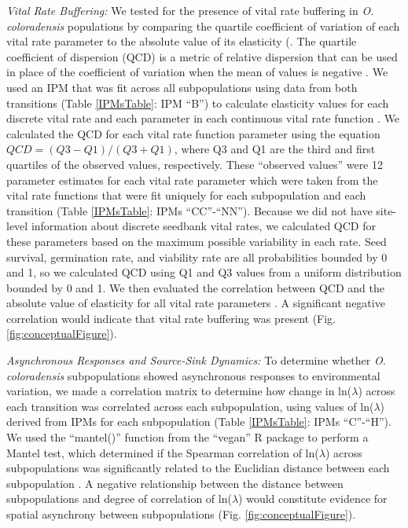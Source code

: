 \documentclass[12pt, letterpaper]{article}
\begin{document}
\textit{Vital Rate Buffering:} We tested for the presence of vital rate buffering in \textit{O. coloradensis} populations by comparing the quartile coefficient of variation of each vital rate parameter to the absolute value of its elasticity (\cite{Pfister1998PatternsImplications, Morris2004BufferingFitness}. The quartile coefficient of dispersion (QCD) is a metric of relative dispersion that can be used in place of the coefficient of variation when the mean of values is negative 
\cite{Bonett2006ConfidenceVariation}. We used an IPM that was fit across all subpopulations using data from both transitions (Table \ref{IPMsTable}: IPM “B”) to calculate elasticity values for each discrete vital rate and each parameter in each continuous vital rate function \cite{Morris2002QuantitativeAnalysis}. We calculated the QCD for each vital rate function parameter using the equation $QCD = (Q3-Q1)/(Q3+Q1)$, where Q3 and Q1 are the third and first quartiles of the observed values, respectively. These “observed values” were 12 parameter estimates for each vital rate parameter which were taken from the vital rate functions that were fit uniquely for each subpopulation and each transition (Table \ref{IPMsTable}: IPMs “CC”-“NN”). Because we did not have site-level information about discrete seedbank vital rates, we calculated QCD for these parameters based on the maximum possible variability in each rate. Seed survival, germination rate, and viability rate are all probabilities bounded by 0 and 1, so we calculated QCD using Q1 and Q3 values from a uniform distribution bounded by 0 and 1. We then evaluated the correlation between QCD and the absolute value of elasticity for all vital rate parameters \cite{Pfister1998PatternsImplications}. A significant negative correlation would indicate that vital rate buffering was present (Fig. \ref{fig:conceptualFigure}).  

\textit{Asynchronous Responses and Source-Sink Dynamics:} To determine whether \textit{O. coloradensis} subpopulations showed asynchronous responses to environmental variation, we made a correlation matrix to determine how change in ln($\lambda$) across each transition was correlated across each subpopulation, using values of ln($\lambda$) derived from IPMs for each subpopulation (Table \ref{IPMsTable}: IPMs “C”-“H”). We used the “mantel()” function from the “vegan” R package to perform a Mantel test, which determined if the Spearman correlation of ln($\lambda$) across subpopulations was significantly related to the Euclidian distance between each subpopulation \cite{Oksanen2020Vegan:Package}. A negative relationship between the distance between subpopulations and degree of correlation of ln($\lambda$) would constitute evidence for spatial asynchrony between subpopulations (Fig. \ref{fig:conceptualFigure}).   
\end{document}
